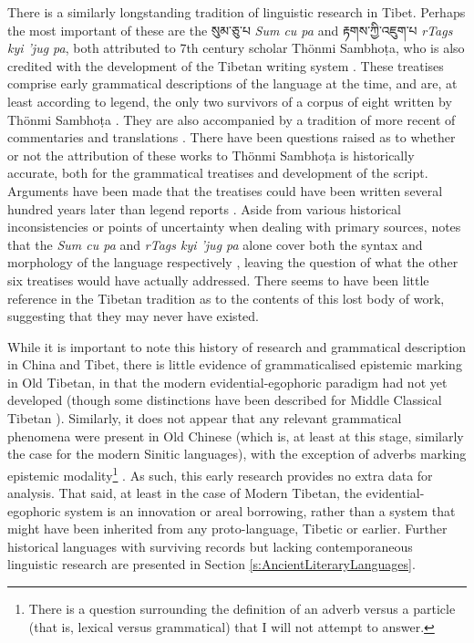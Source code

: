 There is a similarly longstanding tradition of linguistic research in Tibet. Perhaps the most important of these are the \texttibetan{སུམ་ཅུ་པ} \textit{Sum cu pa} and \texttibetan{རྟགས་ཀྱི་འཇུག་པ} \textit{rTags kyi 'jug pa}, both attributed to 7th century scholar Thönmi Sambhoṭa, who is also credited with the development of the Tibetan writing system \cite{MuellerWitter2009}. These treatises comprise early grammatical descriptions of the language at the time, and are, at least according to legend, the only two survivors of a corpus of eight written by Thönmi Sambhoṭa \cite{Miller1963}. They are also accompanied by a tradition of more recent of commentaries and translations \cite{Chashab2008}. There have been questions raised as to whether or not the attribution of these works to Thönmi Sambhoṭa is historically accurate, both for the grammatical treatises and development of the script. Arguments have been made that the treatises could have been written several hundred years later than legend reports \cite{Miller1963}. Aside from various historical inconsistencies or points of uncertainty when dealing with primary sources,  notes that the \textit{Sum cu pa} and \textit{rTags kyi 'jug pa} alone cover both the syntax and morphology of the language respectively \cite{Chashab2008}, leaving the question of what the other six treatises would have actually addressed. There seems to have been little reference in the Tibetan tradition as to the contents of this lost body of work, suggesting that they may never have existed.

While it is important to note this history of research and grammatical description in China and Tibet, there is little evidence of grammaticalised epistemic marking in Old Tibetan, in that the modern evidential-egophoric paradigm had not yet developed \cite{Hill2014} (though some distinctions have been described for Middle Classical Tibetan \cites{Zeisler2018}{Oisel2024}). Similarly, it does not appear that any relevant grammatical phenomena were present in Old Chinese (which is, at least at this stage, similarly the case for the modern Sinitic languages), with the exception of adverbs marking epistemic modality\footnote{There is a question surrounding the definition of an adverb versus a particle (that is, lexical versus grammatical) that I will not attempt to answer.} \cite{Pulleyblank1995}. As such, this early research provides no extra data for analysis. That said, at least in the case of Modern Tibetan, the evidential-egophoric system is an innovation or areal borrowing, rather than a system that might have been inherited from any proto-language, Tibetic or earlier. Further historical languages with surviving records but lacking contemporaneous linguistic research are presented in Section \ref{s:AncientLiteraryLanguages}.

